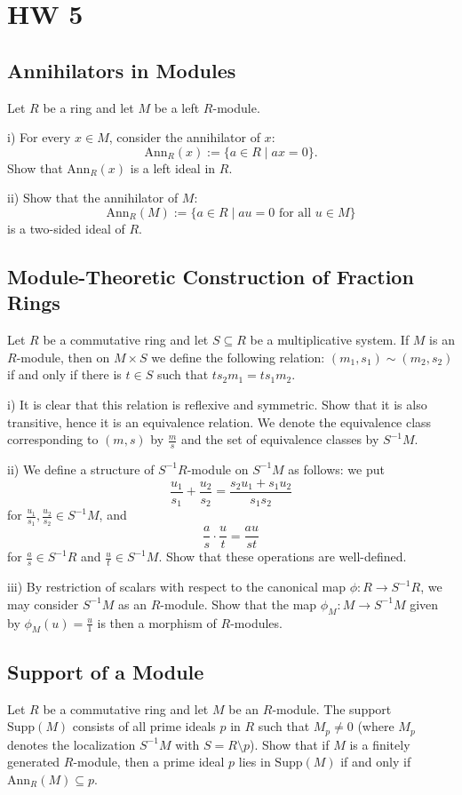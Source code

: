 \documentclass[lang=cn,11pt]{template}
\begin{document}
\chapter{HW 5}

\section{Annihilators in Modules}
Let \( R \) be a ring and let \( M \) be a left \( R \)-module.

i) For every \( x \in M \), consider the annihilator of \( x \):
\[
\text{Ann}_R(x) := \{ a \in R \mid ax = 0 \}.
\]
Show that \( \text{Ann}_R(x) \) is a left ideal in \( R \).

ii) Show that the annihilator of \( M \):
\[
\text{Ann}_R(M) := \{ a \in R \mid au = 0 \text{ for all } u \in M \}
\]
is a two-sided ideal of \( R \).

\section{Module-Theoretic Construction of Fraction Rings}
Let \( R \) be a commutative ring and let \( S \subseteq R \) be a multiplicative system. If \( M \) is an \( R \)-module, then on \( M \times S \) we define the following relation: \( (m_1, s_1) \sim (m_2, s_2) \) if and only if there is \( t \in S \) such that \( ts_2 m_1 = ts_1 m_2 \).

i) It is clear that this relation is reflexive and symmetric. Show that it is also transitive, hence it is an equivalence relation. We denote the equivalence class corresponding to \( (m, s) \) by \( \frac{m}{s} \) and the set of equivalence classes by \( S^{-1}M \).

ii) We define a structure of \( S^{-1}R \)-module on \( S^{-1}M \) as follows: we put
\[
\frac{u_1}{s_1} + \frac{u_2}{s_2} = \frac{s_2 u_1 + s_1 u_2}{s_1 s_2}
\]
for \( \frac{u_1}{s_1}, \frac{u_2}{s_2} \in S^{-1}M \), and
\[
\frac{a}{s} \cdot \frac{u}{t} = \frac{au}{st}
\]
for \( \frac{a}{s} \in S^{-1}R \) and \( \frac{u}{t} \in S^{-1}M \). Show that these operations are well-defined.

iii) By restriction of scalars with respect to the canonical map \( \phi : R \rightarrow S^{-1}R \), we may consider \( S^{-1}M \) as an \( R \)-module. Show that the map \( \phi_M : M \rightarrow S^{-1}M \) given by \( \phi_M(u) = \frac{u}{1} \) is then a morphism of \( R \)-modules.

\section{Support of a Module}
Let \( R \) be a commutative ring and let \( M \) be an \( R \)-module. The support \( \text{Supp}(M) \) consists of all prime ideals \( p \) in \( R \) such that \( M_p \neq 0 \) (where \( M_p \) denotes the localization \( S^{-1}M \) with \( S = R \setminus p \)). Show that if \( M \) is a finitely generated \( R \)-module, then a prime ideal \( p \) lies in \( \text{Supp}(M) \) if and only if \( \text{Ann}_R(M) \subseteq p \).
\end{document}
